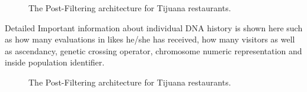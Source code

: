 \begin{figure}
	\centering
	\setlength\fboxsep{0pt}
	\caption{The Post-Filtering architecture for Tijuana restaurants.}
	\label{fig:postfiltering2}     
\end{figure}


Detailed Important information about individual DNA history is shown here such as how many evaluations in likes he/she has received, how many visitors as well as ascendancy, genetic crossing operator, chromosome numeric representation and inside population identifier.


\begin{figure}
	\centering
	\setlength\fboxsep{0pt}
	\caption{The Post-Filtering architecture for Tijuana restaurants.}
	\label{fig:postfiltering3}     
\end{figure}

